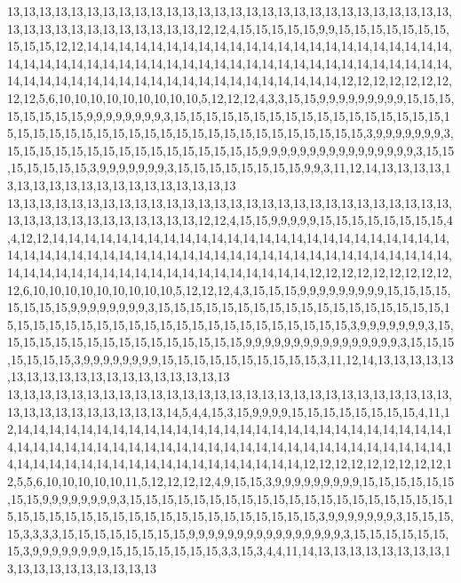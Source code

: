 13,13,13,13,13,13,13,13,13,13,13,13,13,13,13,13,13,13,13,13,13,13,13,13,13,13,13,13,13,13,13,13,13,13,13,13,13,13,13,13,12,12,4,15,15,15,15,15,9,9,15,15,15,15,15,15,15,15,15,15,12,12,14,14,14,14,14,14,14,14,14,14,14,14,14,14,14,14,14,14,14,14,14,14,14,14,14,14,14,14,14,14,14,14,14,14,14,14,14,14,14,14,14,14,14,14,14,14,14,14,14,14,14,14,14,14,14,14,14,14,14,14,14,14,14,14,14,14,14,14,14,14,14,14,12,12,12,12,12,12,12,12,12,5,6,10,10,10,10,10,10,10,10,10,5,12,12,12,4,3,3,15,15,9,9,9,9,9,9,9,9,9,15,15,15,15,15,15,15,15,9,9,9,9,9,9,9,9,3,15,15,15,15,15,15,15,15,15,15,15,15,15,15,15,15,15,15,15,15,15,15,15,15,15,15,15,15,15,15,15,15,15,15,15,15,15,15,15,15,3,9,9,9,9,9,9,9,3,15,15,15,15,15,15,15,15,15,15,15,15,15,15,15,15,9,9,9,9,9,9,9,9,9,9,9,9,9,9,9,9,3,15,15,15,15,15,15,15,3,9,9,9,9,9,9,9,3,15,15,15,15,15,15,15,15,9,9,3,11,12,14,13,13,13,13,13,13,13,13,13,13,13,13,13,13,13,13,13,13,13
13,13,13,13,13,13,13,13,13,13,13,13,13,13,13,13,13,13,13,13,13,13,13,13,13,13,13,13,13,13,13,13,13,13,13,13,13,13,13,13,12,12,4,15,15,9,9,9,9,9,15,15,15,15,15,15,15,15,4,4,12,12,14,14,14,14,14,14,14,14,14,14,14,14,14,14,14,14,14,14,14,14,14,14,14,14,14,14,14,14,14,14,14,14,14,14,14,14,14,14,14,14,14,14,14,14,14,14,14,14,14,14,14,14,14,14,14,14,14,14,14,14,14,14,14,14,14,14,14,14,14,14,14,14,12,12,12,12,12,12,12,12,12,12,6,10,10,10,10,10,10,10,10,10,5,12,12,12,4,3,15,15,15,9,9,9,9,9,9,9,9,9,15,15,15,15,15,15,15,15,9,9,9,9,9,9,9,9,3,15,15,15,15,15,15,15,15,15,15,15,15,15,15,15,15,15,15,15,15,15,15,15,15,15,15,15,15,15,15,15,15,15,15,15,15,15,15,15,15,3,9,9,9,9,9,9,9,3,15,15,15,15,15,15,15,15,15,15,15,15,15,15,15,15,9,9,9,9,9,9,9,9,9,9,9,9,9,9,9,9,3,15,15,15,15,15,15,15,3,9,9,9,9,9,9,9,9,15,15,15,15,15,15,15,15,15,15,3,11,12,14,13,13,13,13,13,13,13,13,13,13,13,13,13,13,13,13,13,13,13
13,13,13,13,13,13,13,13,13,13,13,13,13,13,13,13,13,13,13,13,13,13,13,13,13,13,13,13,13,13,13,13,13,13,13,13,13,13,14,5,4,4,15,3,15,9,9,9,9,15,15,15,15,15,15,15,15,4,11,12,14,14,14,14,14,14,14,14,14,14,14,14,14,14,14,14,14,14,14,14,14,14,14,14,14,14,14,14,14,14,14,14,14,14,14,14,14,14,14,14,14,14,14,14,14,14,14,14,14,14,14,14,14,14,14,14,14,14,14,14,14,14,14,14,14,14,14,14,14,14,14,14,14,14,12,12,12,12,12,12,12,12,12,12,5,5,6,10,10,10,10,10,11,5,12,12,12,12,4,9,15,15,3,9,9,9,9,9,9,9,9,9,15,15,15,15,15,15,15,15,9,9,9,9,9,9,9,9,3,15,15,15,15,15,15,15,15,15,15,15,15,15,15,15,15,15,15,15,15,15,15,15,15,15,15,15,15,15,15,15,15,15,15,15,15,15,15,15,15,3,9,9,9,9,9,9,9,3,15,15,15,15,3,3,3,3,15,15,15,15,15,15,15,15,9,9,9,9,9,9,9,9,9,9,9,9,9,9,9,9,3,15,15,15,15,15,15,15,3,9,9,9,9,9,9,9,9,15,15,15,15,15,15,15,3,3,15,3,4,4,11,14,13,13,13,13,13,13,13,13,13,13,13,13,13,13,13,13,13,13
